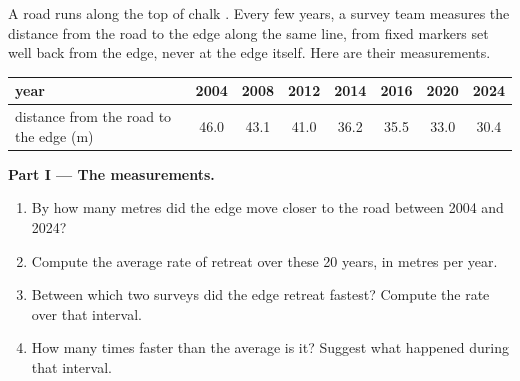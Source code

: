 \begin{problem}
\label{pb:g9:landforms:1}
A  road runs along the top of chalk . Every few years, a survey
team measures the distance from the road to the  edge along the same
line, from fixed markers set well back from the edge, never at the edge
itself. Here are their measurements.

\begin{center}
{\small
\begin{tabular}{|l|c|c|c|c|c|c|c|}
\hline
year & 2004 & 2008 & 2012 & 2014 & 2016 & 2020 & 2024 \\
\hline
distance from the road to the edge (m) & 46.0 & 43.1 & 41.0 & 36.2 & 35.5 & 33.0 & 30.4 \\
\hline
\end{tabular}}
\end{center}

\noindent\textbf{Part I --- The measurements.}\par\nopagebreak
\begin{enumerate}[beginpenalty=10000]
  \item By how many metres did the  edge move closer to the road
        between 2004 and 2024?
  \item Compute the average rate of retreat over these 20 years, in metres
        per year.
  \item Between which two surveys did the edge retreat fastest? Compute the
        rate over that interval.
  \item How many times faster than the average is it? Suggest what
        happened during that interval.
\end{enumerate}

\begin{omfigure}


\end{omfigure}
\end{problem}
